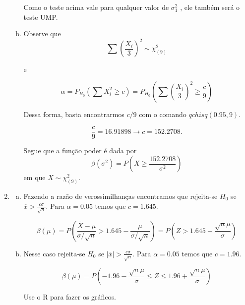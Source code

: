 \documentclass[10pt,brazil]{exam}
\begin{document}
\begin{enumerate}[1.]
\begin{enumerate}[a)]
Como o teste acima vale para qualquer valor de $\sigma_1^2$ , ele  também será o teste UMP. 



\item %
 
 Observe que \[\sum \left(\frac{X_i}{3}\right)^2\sim\chi^2_{(9)}\]
 
 e 
 
 \[\alpha = P_{H_0}\left(\sum X_i^2 \geq c\right)=P_{H_0}\left( \sum\left(\frac{X_i}{3}\right)^2\geq \frac{c}{9}\right)\]
 
 Dessa forma, basta encontrarmos $c/9$ com o comando  $qchisq(0.95,9).$

 \[\frac{c}{9}=16.91898 \rightarrow c=152.2708.\]
 
 Segue que  a função poder é dada por \[\beta(\sigma^2)=P\left(X\geq \frac{152.2708}{\sigma^2}\right)\]
 em que $X\sim\chi^2_{(9)}$.
\end{enumerate}




\medskip
\item 
\begin{enumerate}[a)]
\item %


Fazendo a razão de verossimilhanças encontramos que rejeita-se $H_0$ se $\overline{x}>\frac{c\sigma}{\sqrt{n}}$. Para $\alpha=0.05$ temos que $c=1.645$.

\[\beta(\mu)=P\left(\frac{\overline{X}-\mu}{\sigma/\sqrt{n}}>1.645-\frac{\mu}{\sigma/\sqrt{n}}\right)=P\left(Z>1.645-\frac{\sqrt{n}\mu}{\sigma}\right)\]

\item %
Nesse caso rejeita-se $H_0$ se $|\overline{x}|>\frac{c\sigma}{\sqrt{n}}$. Para $\alpha=0.05$ temos que $c=1.96$.

\[\beta(\mu)=P\left(-1.96-\frac{\sqrt{n}\mu}{\sigma}\leq Z\leq 1.96+\frac{\sqrt{n}\mu}{\sigma}\right)\]

Use o R para fazer os gráficos. 
\end{enumerate}









\end{enumerate}
\end{document}
